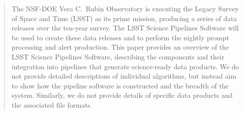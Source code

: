 
\begin{abstract}

The NSF-DOE Vera C.\ Rubin Observatory is executing the Legacy Survey of Space and Time (LSST) as its prime mission,  producing a series of data releases over the ten-year survey.
The LSST Science Pipelines Software will be used to create these data releases and to perform the nightly prompt processing and alert production.
This paper provides an overview of the LSST Science Pipelines Software, describing the components and their integration into pipelines that generate science-ready data products.
We do not provide detailed descriptions of individual algorithms, but instead aim to show how the pipeline software is constructed and the breadth of the system.
Similarly, we do not provide details of specific data products and the associated file formats.

\end{abstract}
